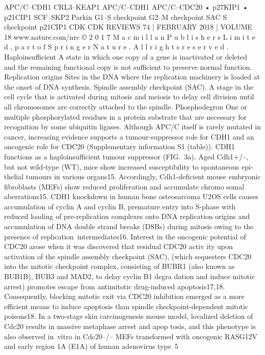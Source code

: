 APC/C–CDH1
CRL3–KEAP1
APC/C–CDH1
APC/C–CDC20
• p27KIP1
• p21CIP1
SCF–SKP2
Parkin
G1–S
checkpoint
G2–M checkpoint
SAC
S checkpoint
p21CIP1
CDK
CDK
REVIEWS
74 | FEBRUARY 2018 | VOLUME 18
www.nature.com/nrc
©
 2
0
1
7
 M
a
c
m
i
l
l
a
n
 P
u
b
l
i
s
h
e
r
s
 L
i
m
i
t
e
d
,
 p
a
r
t
 o
f
 S
p
r
i
n
g
e
r
 N
a
t
u
r
e
.
 A
l
l
 r
i
g
h
t
s
 r
e
s
e
r
v
e
d
.
Haploinsufficient
A state in which one copy of a
gene is inactivated or deleted
and the remaining functional
copy is not sufficient to
preserve normal function.
Replication origins
Sites in the DNA where the
replication machinery is loaded
at the onset of DNA synthesis.
Spindle assembly
checkpoint
(SAC). A stage in the cell cycle
that is activated during mitosis
and meiosis to delay cell
division until all chromosomes
are correctly attached to the
spindle.
Phosphodegron
One or multiple
phosphorylated residues in a
protein substrate that are
necessary for recognition by
some ubiquitin ligases.
Although APC/C itself is rarely mutated in cancer,
increasing evidence supports a tumour-­suppressor
role for CDH1 and an oncogenic role for CDC20
(Supplementary information S1 (table)). CDH1
functions as a haploinsufficient tumour suppressor
(FIG. 3a). Aged Cdh1+/–, but not wild-type (WT), mice
show increased susceptibility to spontaneous epi­
thelial tumours in various organs15. Accordingly,
Cdh1‑deficient mouse embryonic fibroblasts (MEFs)
show reduced proliferation and accumulate chromo­
somal aberrations15. CDH1 knockdown in human
bone osteosarcoma U2OS cells causes accumulation
of cyclin A and cyclin B, premature entry into S‑phase
with reduced loading of pre-replication complexes
onto DNA replication origins and accumulation of DNA
­double strand breaks (DSBs) during mitosis owing to
the presence of replication intermediates16.
Interest in the oncogenic potential of CDC20 arose
when it was discovered that residual CDC20 activ­
ity upon activation of the spindle assembly checkpoint
(SAC), (which sequesters CDC20 into the mitotic
checkpoint complex, consisting of BUBR1 (also known
as BUB1B), BUB3 and MAD2, to delay cyclin B1 degra­
dation and induce mitotic arrest) promotes escape from
antimitotic drug-induced apoptosis17,18. Consequently,
blocking mitotic exit via CDC20 inhibition emerged as
a more efficient means to induce apoptosis than spindle
checkpoint-­dependent mitotic poisons18. In a two-stage
skin carcinogenesis mouse model, localized deletion of
Cdc20 results in massive metaphase arrest and apop­
tosis, and this phenotype is also observed in vitro in
Cdc20–/– MEFs transformed with oncogenic RASG12V
and early region 1A (E1A) of human adenovirus type 5

